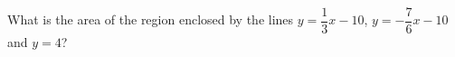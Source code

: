 What is the area of the region enclosed by the lines $y=\dfrac{1}{3}x-10$, $y=-\dfrac{7}{6}x-10$ and $y=4$?
